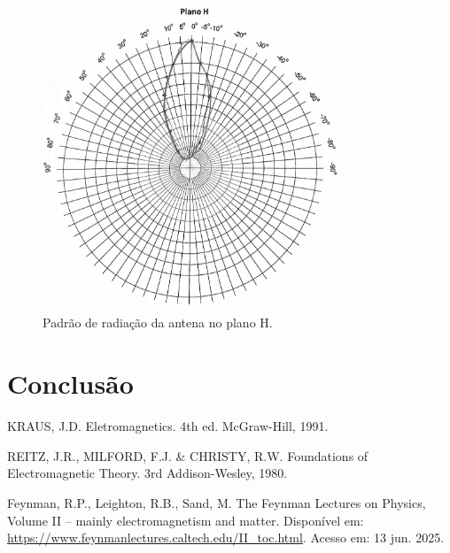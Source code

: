 \documentclass[12pt]{article}
\begin{document}
\begin{figure}[H]
  \centering
  \includegraphics[width=0.8\textwidth]{img/planoh.png}
  \caption{Padrão de radiação da antena no plano H.}
  \label{fig:img/planoh.png}
\end{figure}

\clearpage
\section{Conclusão}

\clearpage
\begin{thebibliography}{9}
  KRAUS, J.D. Eletromagnetics. 4th ed. McGraw-Hill, 1991.

  REITZ, J.R., MILFORD, F.J. \& CHRISTY, R.W. Foundations of
  Electromagnetic Theory. 3rd Addison-Wesley, 1980.

  Feynman, R.P., Leighton, R.B., Sand, M. The Feynman Lectures on
  Physics, Volume II – mainly electromagnetism and matter. Disponível
  em: \url{https://www.feynmanlectures.caltech.edu/II_toc.html}.
  Acesso em: 13 jun. 2025.
\end{thebibliography}
\end{document}
